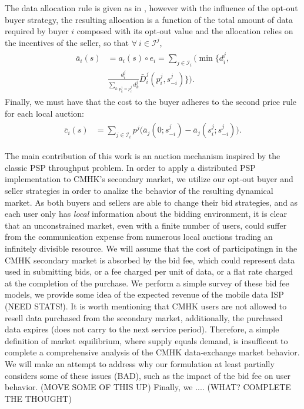 \documentclass[12pt]{article}
\theoremstyle{definition}
\newcommand{\mcI}{\mathcal{I}}
\begin{document}
\begin{multicols}{2}
The data allocation rule is given as in \cite{semret}, however with the
influence of the opt-out buyer strategy, the resulting allocation is a function of the total amount of data
required by buyer $i$ composed with its opt-out value and the allocation relies
on the incentives of the seller, so that $\forall \ i \in \mcI^j$,
\begin{align}\label{dataallocation}
\begin{split}
    \bar{a}_i(s) &= a_i(s) \circ e_i =
\displaystyle\sum_{j\in\mcI_i}\bigg(\min\bigg\lbrace d_i^j,
\\
    &\frac{d_i^j}{\sum_{k:p_k^j=
p_i^j}d_k^j}
\bar{D}_i^j(p_i^j,s_{-i}^j)\bigg\rbrace\bigg).
\end{split}
\end{align}
Finally, we must have that the cost to the buyer adheres to the second price rule for each local auction:
\begin{align}\label{datacost}
\begin{split}
    \bar{c}_i(s) &= \displaystyle\sum_{j\in\mcI_i} 
p^j \bigg(\bar{a}_j(0; s_{-i}^j)
    -\bar{a}_j(s_i^j;s_{-i}^j)\bigg).
\end{split}
\end{align}


The main contribution of this work 
is an auction mechanism inspired by the classic PSP throughput problem. In
order to apply a distributed PSP implementation to CMHK's secondary market,
we utilize our opt-out buyer and seller strategies in order to analize the
behavior of the resulting dynamical market. As both buyers and sellers are able
to change their bid strategies, and as each user only has \emph{local}
information about the bidding environment, it is clear that an unconstrained
market, even with a finite number of users, could suffer from the communication
expense from numerous local auctions trading an infinitely divisible resource.
We will assume that the cost of participatingn in the CMHK secondary market is
absorbed by the bid fee, which could represent data used in submitting bids, or
a fee charged per unit of data, or a flat rate charged at the completion of the
purchase. We perform a simple survey of these bid fee models, we
provide some idea of the expected revenue of the mobile data ISP (NEED
STATS!). It is worth mentioning that CMHK users are not allowed to resell data purchased from the secondary
market, additionally, the purchased data expires (does not carry to the next
service period). Therefore, a simple definition of market equilibrium, where
supply equals demand, is insufficent to complete a comprehensive analysis of
the CMHK data-exchange market behavior. We will make an attempt to address why
our formulation at least partially considers some of these issues (BAD), such
as the impact of the bid fee on user behavior. (MOVE SOME OF THIS UP)
Finally, we  .... (WHAT? COMPLETE THE THOUGHT)


\end{multicols}
\end{document}
